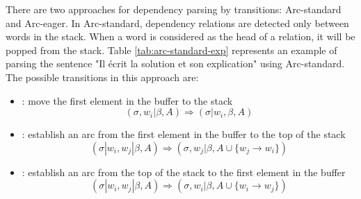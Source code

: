 \documentclass{KodeBook}
\begin{document}
There are two approaches for dependency parsing by transitions: Arc-standard and Arc-eager. In Arc-standard, dependency relations are detected only between words in the stack. When a word is considered as the head of a relation, it will be popped from the stack. Table \ref{tab:arc-standard-exp} represents an example of parsing the sentence "Il écrit la solution et son explication" using Arc-standard. The possible transitions in this approach are:
\begin{itemize}
	\item {}: move the first element in the buffer to the stack
	\[ (\sigma, w_i|\beta, A) \Rightarrow  (\sigma|w_i, \beta, A) \]
	
	\item {}: establish an arc from the first element in the buffer to the top of the stack
	\[ (\sigma|w_i, w_j|\beta, A) \Rightarrow  (\sigma, w_j|\beta, A \cup \{w_j \rightarrow w_i \}) \] 
	
	\item {}: establish an arc from the top of the stack to the first element in the buffer
	\[ (\sigma|w_i, w_j|\beta, A) \Rightarrow  (\sigma, w_i|\beta, A \cup \{w_i \rightarrow w_j \}) \] 
\end{itemize}
\end{document}
